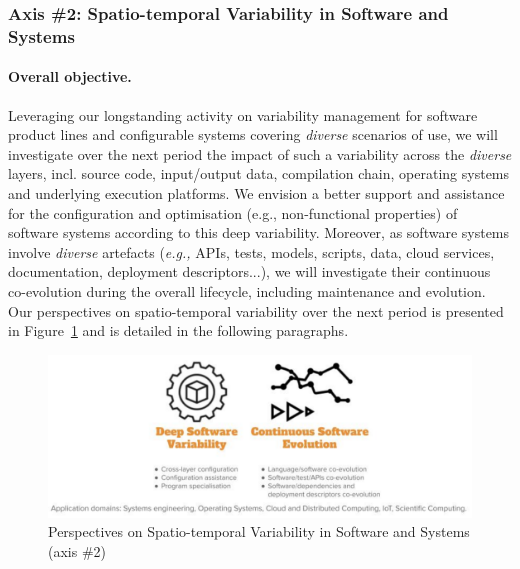 	
		\subsubsection{Axis \#2: Spatio-temporal Variability in Software and Systems} \label{sec:future-axis2-variability}


 
\paragraph{Overall objective.} Leveraging our longstanding activity on variability management for software product lines and configurable systems covering \emph{diverse} scenarios of use, we will investigate over the next period the impact of such a variability across the \emph{diverse} layers, incl. source code, input/output data, compilation chain, operating systems and underlying execution platforms. We envision a better support and assistance for the configuration and optimisation (e.g., non-functional properties) of software systems according to this deep variability. Moreover, as software systems involve \emph{diverse} artefacts (\emph{e.g.,} APIs, tests, models, scripts, data, cloud services, documentation, deployment descriptors...), we will investigate their continuous co-evolution during the overall lifecycle, including maintenance and evolution. Our perspectives on spatio-temporal variability over the next period is presented in Figure~\ref{fig:perspectives-variability} and is detailed in the following paragraphs.

\begin{figure}[h]
\centering
\includegraphics[width=\columnwidth]{IMG/variability.pdf}
\caption{Perspectives on Spatio-temporal Variability in Software and Systems (axis \#2)}
\label{fig:perspectives-variability}
\end{figure}

